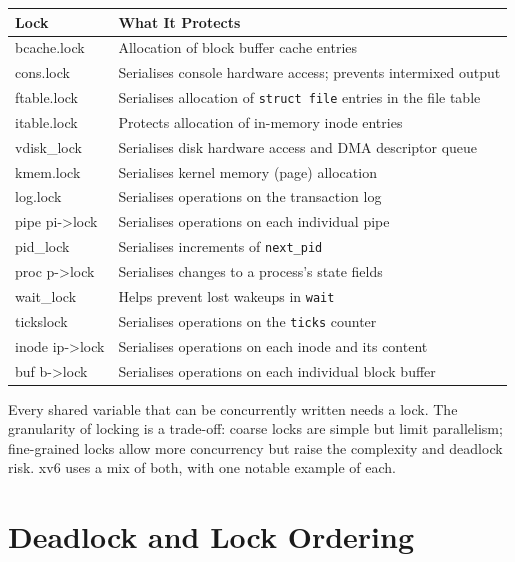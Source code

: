 \documentclass[11pt, a4paper]{article}
\begin{document}
\begin{center}
\renewcommand{\arraystretch}{1.2}
\begin{tabular}{@{}>{\ttfamily}lp{9cm}@{}}
\toprule
\textbf{Lock} & \textbf{What It Protects} \\
\midrule
bcache.lock   & Allocation of block buffer cache entries \\
cons.lock     & Serialises console hardware access; prevents intermixed output \\
ftable.lock   & Serialises allocation of \lstinline|struct file| entries in the file table \\
itable.lock   & Protects allocation of in-memory inode entries \\
vdisk\_lock   & Serialises disk hardware access and DMA descriptor queue \\
kmem.lock     & Serialises kernel memory (page) allocation \\
log.lock      & Serialises operations on the transaction log \\
pipe pi->lock & Serialises operations on each individual pipe \\
pid\_lock     & Serialises increments of \lstinline|next_pid| \\
proc p->lock  & Serialises changes to a process's state fields \\
wait\_lock    & Helps prevent lost wakeups in \lstinline|wait| \\
tickslock     & Serialises operations on the \lstinline|ticks| counter \\
inode ip->lock& Serialises operations on each inode and its content \\
buf b->lock   & Serialises operations on each individual block buffer \\
\bottomrule
\end{tabular}
\end{center}

\begin{tcolorbox}[summary, title={Section Summary}]
Every shared variable that can be concurrently written needs a lock. The granularity of locking is a trade-off: coarse locks are simple but limit parallelism; fine-grained locks allow more concurrency but raise the complexity and deadlock risk. xv6 uses a mix of both, with one notable example of each.
\end{tcolorbox}

\section{Deadlock and Lock Ordering}
\end{document}
